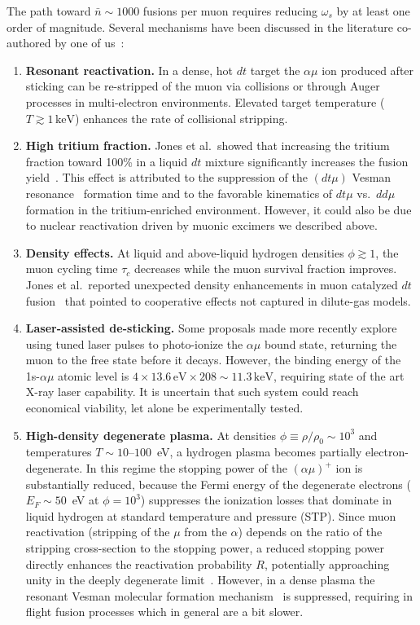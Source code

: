 \documentclass[particles,article,accept,pdftex,moreauthors]{Definitions/mdpi}
\begin{document}
The path toward $\bar{n}\sim 1000$ fusions per muon requires reducing $\omega_s$ by at least one order of magnitude. Several mechanisms have been discussed in the literature co-authored by one of us~\cite{Rafelski:1987Jones,Rafelski:1990gg,Rafelski:1990in}: 

\begin{enumerate}
\item {\bf Resonant reactivation.} In a dense, hot $dt$ target the $\alpha\mu$ ion produced after sticking can be re-stripped of the muon via collisions or through Auger processes in multi-electron environments. Elevated target temperature ($T \gtrsim 1\,\mathrm{keV}$) enhances the rate of collisional stripping. 
%
\item {\bf High tritium fraction.} Jones et al.\ showed that increasing the tritium fraction toward 100\% in a liquid $dt$ mixture significantly increases the fusion yield~\cite{jones1993evaluation}. This effect is attributed to the suppression of the $(dt\mu)$ Vesman resonance~\cite{Vesman:1967} formation time and to the favorable kinematics of $dt\mu$ vs.\ $dd\mu$ formation in the tritium-enriched environment. However, it could also be due to nuclear reactivation driven by muonic excimers we described above.
%
\item {\bf Density effects.} At liquid and above-liquid hydrogen densities $\phi \gtrsim 1$, the muon cycling time $\tau_c$ decreases while the muon survival fraction improves. Jones et al.\ reported unexpected density enhancements in muon catalyzed $dt$ fusion~\cite{Jones:1986kk} that pointed to cooperative effects not captured in dilute-gas models. 
%
\item {\bf Laser-assisted de-sticking.} Some proposals made more recently explore using tuned laser pulses to photo-ionize the $\alpha\mu$ bound state, returning the muon to the free state before it decays. However, the binding energy of the 1s-$\alpha\mu$ atomic level is $4\times 13.6\,\mathrm{eV}\times 208\sim 11.3\,\mathrm{keV}$, requiring state of the art X-ray laser capability. It is uncertain that such system could reach economical viability, let alone be experimentally tested.
%
\item {\bf High-density degenerate plasma.} At densities $\phi\equiv\rho/\rho_0\sim 10^3$ and temperatures $T\sim 10$--$100$~eV, a hydrogen plasma becomes partially electron-degenerate. In this regime the stopping power of the $(\alpha\mu)^+$ ion is substantially reduced, because the Fermi energy of the degenerate electrons ($E_F\sim 50$~eV at $\phi=10^3$) suppresses the ionization losses that dominate in liquid hydrogen at standard temperature and pressure (STP). Since muon reactivation (stripping of the $\mu$ from the $\alpha$) depends on the ratio of the stripping cross-section to the stopping power, a reduced stopping power directly enhances the reactivation probability $R$, potentially approaching unity in the deeply degenerate limit~\cite{Rafelski:1988wq,Rafelski:1991DOE}. However, in a dense plasma the resonant Vesman molecular formation mechanism~\cite{Vesman:1967} is suppressed, requiring in flight fusion processes which in general are a bit slower.
%
\end{enumerate}
\end{document}
